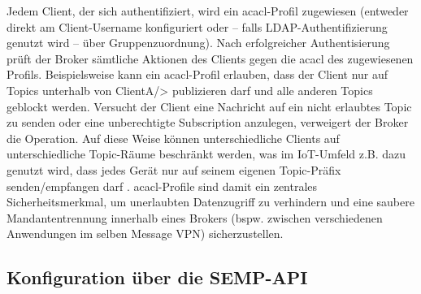 Jedem Client, der sich authentifiziert, wird ein ac{acl}-Profil zugewiesen (entweder direkt am Client-Username konfiguriert oder – falls LDAP-Authentifizierung genutzt wird – über Gruppenzuordnung). Nach erfolgreicher Authentisierung prüft der Broker sämtliche Aktionen des Clients gegen die ac{acl} des zugewiesenen Profils. Beispielsweise kann ein ac{acl}-Profil erlauben, dass der Client nur auf Topics unterhalb von ClientA/> publizieren darf und alle anderen Topics geblockt werden. Versucht der Client eine Nachricht auf ein nicht erlaubtes Topic zu senden oder eine unberechtigte Subscription anzulegen, verweigert der Broker die Operation. Auf diese Weise können unterschiedliche Clients auf unterschiedliche Topic-Räume beschränkt werden, was im IoT-Umfeld z.B. dazu genutzt wird, dass jedes Gerät nur auf seinem eigenen Topic-Präfix senden/empfangen darf \cite{AvnetPSK}. ac{acl}-Profile sind damit ein zentrales Sicherheitsmerkmal, um unerlaubten Datenzugriff zu verhindern und eine saubere Mandantentrennung innerhalb eines Brokers (bspw. zwischen verschiedenen Anwendungen im selben Message VPN) sicherzustellen.

\subsection{Konfiguration über die SEMP-API}

